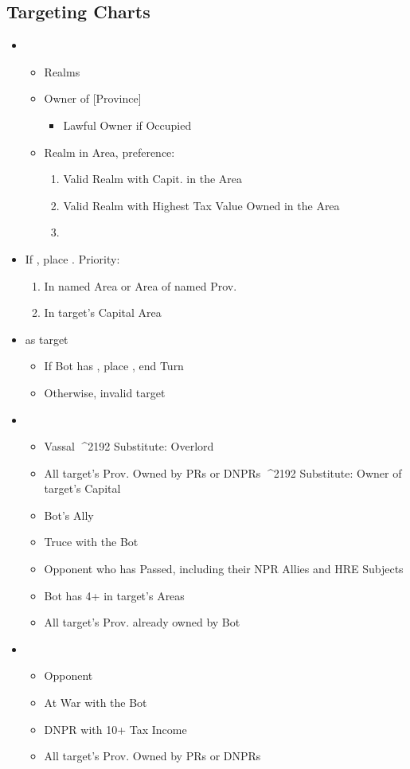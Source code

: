 \documentclass[10pt]{article}
\begin{document}
\subsection*{Targeting Charts }
\begin{itemize}
	\item {}
	\begin{itemize}
		\item Realms
		\item \dprime Owner of [Province]\dprime
		\begin{itemize}
			\item Lawful Owner if Occupied
		\end{itemize}
		\item \dprime Realm in Area\dprime, preference:
		\begin{enumerate}
			\item Valid Realm with Capit. in the Area
			\item Valid Realm with Highest Tax Value Owned in the Area
			\item \az
		\end{enumerate}
	\end{itemize}
	\item If , place \claim. Priority:
	\begin{enumerate}
		\item In named Area or Area of named Prov.
		\item In target's Capital Area
	\end{enumerate}
	\item {} as target
	\begin{itemize}
		\item If Bot has , place \claim, end Turn
		\item Otherwise, invalid target
	\end{itemize}
	\item {}
	\begin{itemize}
		\item Vassal ^^^^2192 Substitute: Overlord
		\item All target's Prov. Owned by PRs or DNPRs ^^^^2192 Substitute: Owner of target's Capital
		\item Bot's Ally
		\item Truce with the Bot
		\item Opponent who has Passed, including their NPR Allies and HRE Subjects 
		\item Bot has 4+ \influence in target's Areas
		\item All target's Prov. already owned by Bot
	\end{itemize}
	\item {}
	\begin{itemize}
		\item Opponent
		\item At War with the Bot
		\item DNPR with 10+ Tax Income
		\item All target's Prov. Owned by PRs or DNPRs
	\end{itemize}
\end{itemize}
\end{document}
